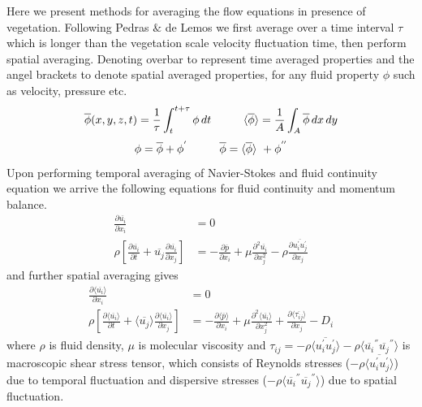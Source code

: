 \documentclass[12pt]{report}   %
\renewcommand{\bar}{\overline}
\begin{document}
Here we present methods for averaging the flow equations in presence of vegetation. Following Pedras $\&$ de Lemos we first average over a time interval $\tau$ which is longer than the vegetation scale velocity fluctuation time, then perform spatial averaging. Denoting 
overbar to represent time averaged properties and the angel brackets to denote spatial averaged properties, for any fluid property $\phi$ such as velocity, pressure etc.
  \[ \bar{\phi}(x,y,z,t) = \frac{1}{\tau} \int_{t}^{t+\tau} \phi  \, dt \hspace{1.cm}  \langle \bar{\phi}\rangle = \frac{1}{A} \int_{A} \bar{\phi}  \,dx \,dy \]
  \[\phi = \bar{\phi}+\phi^{'} \hspace{1.cm}  \bar{\phi} = \langle \bar{\phi} \rangle \ +\phi^{''} \]
 Upon performing temporal averaging of Navier-Stokes and fluid continuity equation we arrive the following equations for fluid continuity and momentum balance.
 \begin{equation}
 \begin{split}
 \frac{\partial \bar{u_i} }{\partial x_i} &=0 \\
 \rho \left[ \frac{\partial  \overline{u_i}  }{\partial t}+  \overline{u_j}  \frac{\partial  \overline{u_i} }{\partial x_j} \right ] &= -\frac{\partial  \bar{p}   }{\partial x_i} + \mu \frac{\partial^2  \overline{u_i}  }{\partial x_j^2} - \rho \frac{\partial  \overline { u_i^{'} u_j^{'} }  }{\partial x_j} 
 \end{split}
 \end{equation}
 and further spatial averaging gives
  \begin{equation}\label{averaged_eq}
  \begin{split}
  \frac{\partial \langle \bar{u_i} \rangle}{\partial x_i}&=0 \\
 \rho \left[ \frac{\partial \langle \overline{u_i} \rangle }{\partial t}+ \langle \overline{u_j} \rangle \frac{\partial \langle \bar{u_i} \rangle}{\partial x_j} \right ] &= -\frac{\partial \langle \bar{p} \rangle  }{\partial x_i} + \mu \frac{\partial^2 \langle \bar{u_i} \rangle }{\partial         x_j^2} + \frac{\partial \langle \bar{\tau_{ij}} \rangle }{\partial x_j} -D_i
 \end{split}
 \end{equation}
 where $\rho$ is fluid density, $\mu$ is molecular viscosity and 
 $\tau_{ij}=-\rho \langle \overline{u_i^{'} u_j^{'}} \rangle  -\rho \langle{ \overline{u_i}^{''} \overline{u_j}^{''} } \rangle  $ is macroscopic shear stress tensor, which consists of Reynolds stresses ($ -\rho \langle \overline {u_i^{'} u_j^{'}} \rangle $) due to temporal fluctuation and dispersive stresses ($ -\rho \langle{ \overline{u_i}^{''} \overline{u_j}^{''} } \rangle $) due to spatial fluctuation.
 
\end{document}
